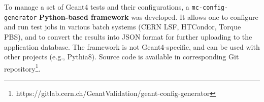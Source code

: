 
To manage a set of Geant4 tests and their configurations, a {\tt mc-config-generator} \textbf{Python-based framework} was developed. It allows one to configure and run test jobs in various batch systems (CERN LSF, HTCondor, Torque PBS), and to convert the results into  JSON format for further uploading to the application database. The framework is not Geant4-specific, and can be used with other projects (e.g., Pythia8). Source code is available in corresponding Git repository\footnote{https://gitlab.cern.ch/GeantValidation/geant-config-generator}.

